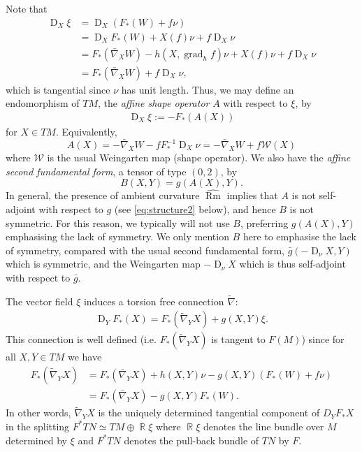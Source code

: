 \documentclass{amsart}
\theoremstyle{definition}
\theoremstyle{remark}
\DeclareMathOperator{\grad}{grad}
\DeclareMathOperator{\Rm}{Rm}
\DeclareMathOperator{\D}{D}
\DeclareMathOperator{\RR}{\mathbb{R}}
\numberwithin{equation}{section}
\begin{document}
Note that
\begin{align*}
\D_X \xi &= \D_X (F_{\ast}(W) + f \nu) \\
&= \D_X F_{\ast}(W) + X(f)\nu + f \D_X \nu \\
&= F_{\ast}(\bar{\nabla}_X W) - h(X, \grad_h f) \nu + X(f) \nu + f \D_X \nu \\
&= F_{\ast} (\bar{\nabla}_X W) + f \D_X \nu,
\end{align*}
which is tangential since $\nu$ has unit length. Thus, we may define an endomorphism of $TM$, the \emph{affine shape operator} $A$ with respect to $\xi$, by
\begin{align}
\D_X\xi := -F_{\ast}(A(X))
\end{align}
for $X\in TM$. Equivalently,
\[
A(X) =- \bar{\nabla}_X W - f F_{\ast}^{-1} \D_X \nu = -\bar{\nabla}_X W + f \mathcal{W} (X)
\]
where $\mathcal{W}$ is the usual Weingarten map (shape operator). We also have the \emph{affine second fundamental form}, a tensor of type $(0, 2)$, by
\[
B(X, Y) = g(A(X), Y).
\]
In general, the presence of ambient curvature $\widehat{\Rm}$ implies that $A$ is not self-adjoint with respect to $g$ (see \eqref{eq:structure2} below), and hence $B$ is not symmetric. For this reason, we typically will not use $B$, preferring $g(A(X), Y)$ emphasising the lack of symmetry. We only mention $B$ here to emphasise the lack of symmetry, compared with the usual second fundamental form, $\bar{g}(-\D_{\nu} X, Y)$ which is symmetric, and the Weingarten map $-\D_{\nu} X$ which is thus self-adjoint with respect to $\bar{g}$.

The vector field $\xi$ induces a torsion free connection $\tilde{\nabla}$:
\begin{align}\label{gauss equ2}
\D_YF_{\ast}(X)=F_{\ast}(\tilde{\nabla}_YX)+g(X,Y)\xi.
\end{align}
This connection is well defined (i.e. $F_{\ast}(\tilde{\nabla}_Y X)$ is tangent to $F(M)$) since for all $X,Y\in TM$ we have
\begin{align}
F_{\ast}(\tilde{\nabla}_Y X) &= F_{\ast}(\bar{\nabla}_Y X) + h(X, Y) \nu - g(X, Y) (F_{\ast}(W) + f \nu) \\
&= F_{\ast}(\bar{\nabla}_YX)-g(X,Y)F_{\ast}(W) \nonumber.
\end{align}
In other words, $\tilde{\nabla}_Y X$ is the uniquely determined tangential component of $D_Y F_{\ast} X$ in the splitting $F^{\ast} TN \simeq TM \oplus \RR \xi$ where $\RR\xi$ denotes the line bundle over $M$ determined by $\xi$ and $F^{\ast} TN$ denotes the pull-back bundle of $TN$ by $F$.
\end{document}
